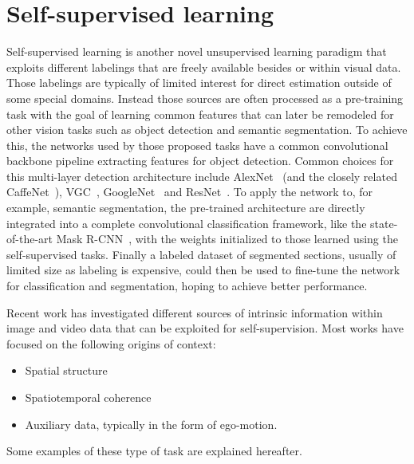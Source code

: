 \section{Self-supervised learning}
Self-supervised learning is another novel unsupervised learning paradigm that exploits different labelings that are freely available besides or within visual data. Those labelings are typically of limited interest for direct estimation outside of some special domains. Instead those sources are often processed as a pre-training task with the goal of learning common features that can later be remodeled for other vision tasks such as object detection and semantic segmentation\cite{misra2016}. To achieve this, the networks used by those proposed tasks have a common convolutional backbone pipeline extracting features for object detection. Common choices for this multi-layer detection architecture include AlexNet~\cite{krizhevsky2012} (and the closely related CaffeNet~\cite{jia2014}), VGC~\cite{simonyan2014}, GoogleNet~\cite{szegedy2015} and ResNet~\cite{he2016}. To apply the network to, for example, semantic segmentation, the pre-trained architecture are directly integrated into a complete convolutional classification framework, like the state-of-the-art Mask R-CNN~\cite{he2017}, with the weights initialized to those learned using the self-supervised tasks. Finally a labeled dataset of segmented sections, usually of limited size as labeling is expensive, could then be used to fine-tune the network for classification and segmentation, hoping to achieve better performance.

Recent work has investigated different sources of intrinsic information within image and video data that can be exploited for self-supervision. Most works have focused on the following origins of context: 
\begin{itemize}
\item Spatial structure
\item Spatiotemporal coherence 
\item Auxiliary data, typically in the form of ego-motion.
\end{itemize}
Some examples of these type of task are explained hereafter.

